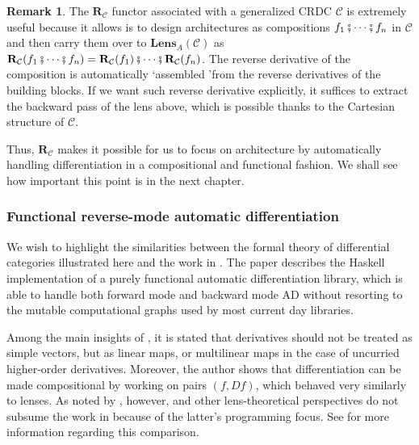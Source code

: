 \documentclass[12pt,a4paper,openright,twoside]{report}
\theoremstyle{plain}
\theoremstyle{definition}
\newtheorem{remark}[proposition]{Remark}
\begin{document}
\begin{remark}
  \label{rem: Rcisuseful}
  The $\mathbf{R}_{\mathcal{C}}$ functor associated with a generalized CRDC $\mathcal{C}$ is extremely useful because it allows is to design architectures as compositions $f_1 \fatsemi \cdots \fatsemi f_n$ in $\mathcal{C}$ and then carry them over to $\mathbf{Lens}_A(\mathcal{C})$ as $\mathbf{R}_{\mathcal{C}}(f_1 \fatsemi \cdots \fatsemi f_n) = \mathbf{R}_{\mathcal{C}}(f_1) \fatsemi \cdots \fatsemi \mathbf{R}_{\mathcal{C}}(f_n)$.  The reverse derivative of the composition is automatically \lq assembled \rq from the reverse derivatives of the building blocks. If we want such reverse derivative explicitly, it suffices to extract the backward pass of the lens above, which is possible thanks to the Cartesian structure of $\mathcal{C}$.


  Thus, $\mathbf{R}_{\mathcal{C}}$ makes it possible for us to focus on architecture by automatically handling differentiation in a compositional and functional fashion. We shall see how important this point is in the next chapter.
\end{remark}

\subsubsection{Functional reverse-mode automatic differentiation}

We wish to highlight the similarities between the formal theory of differential categories illustrated here and the work in \cite{elliott2018simple}. The paper describes the Haskell implementation of a purely functional automatic differentiation library, which is able to handle both forward mode and backward mode AD without resorting to the mutable computational graphs used by most current day libraries. 

Among the main insights of \cite{elliott2018simple}, it is stated that derivatives should not be treated as simple vectors, but as linear maps, or multilinear maps in the case of uncurried higher-order derivatives. Moreover, the author shows that differentiation can be made compositional by working on pairs $(f, Df)$, which behaved very similarly to lenses. As noted by \cite{shiebler2021category}, however, \cite{cruttwell2022categorical} and other lens-theoretical perspectives do not subsume the work in \cite{elliott2018simple} because of the latter's programming focus. See \cite{shiebler2021category} for more information regarding this comparison.
\end{document}
